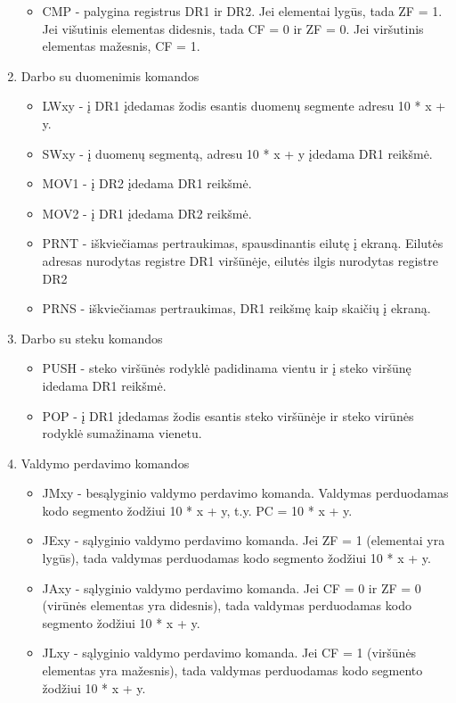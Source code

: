 \begin{enumerate}
		\begin{itemize}
		\item CMP - palygina registrus DR1 ir DR2. Jei elementai lygūs, tada ZF = 1. Jei višutinis elementas didesnis, tada CF = 0 ir  ZF = 0. Jei viršutinis elementas mažesnis, CF = 1.
		\end{itemize}
	\item Darbo su duomenimis komandos
		\begin{itemize}
		\item LWxy - į DR1 įdedamas žodis esantis duomenų segmente adresu 10 * x + y.
		\item SWxy - į duomenų segmentą, adresu 10 * x + y įdedama DR1 reikšmė.
		\item MOV1 - į DR2 įdedama DR1 reikšmė.
		\item MOV2 - į DR1 įdedama DR2 reikšmė.
		\item PRNT - iškviečiamas pertraukimas, spausdinantis eilutę į ekraną. Eilutės adresas nurodytas registre DR1 viršūnėje, eilutės ilgis nurodytas registre DR2
		\item PRNS - iškviečiamas pertraukimas, DR1 reikšmę kaip skaičių į ekraną.
		\end{itemize}
	\item Darbo su steku komandos
		\begin{itemize}
		\item PUSH - steko viršūnės rodyklė padidinama vientu ir į steko viršūnę idedama DR1 reikšmė.
		\item POP - į DR1 įdedamas žodis esantis steko viršūnėje ir steko virūnės rodyklė sumažinama vienetu.
		\end{itemize}
	\item Valdymo perdavimo komandos
		\begin{itemize}
		\item JMxy - besąlyginio valdymo perdavimo komanda. Valdymas perduodamas kodo segmento žodžiui 10 * x + y, t.y. PC = 10 * x + y.
		\item JExy - sąlyginio valdymo perdavimo komanda. Jei ZF = 1 (elementai yra lygūs), tada valdymas perduodamas kodo segmento žodžiui 10 * x + y.
		\item JAxy - sąlyginio valdymo perdavimo komanda. Jei CF = 0 ir ZF = 0 (virūnės elementas yra didesnis), tada valdymas perduodamas kodo segmento žodžiui 10 * x + y.
		\item JLxy  - sąlyginio valdymo perdavimo komanda. Jei CF = 1 (viršūnės elementas yra mažesnis), tada valdymas perduodamas kodo segmento žodžiui 10 * x + y.
		\end{itemize}

\end{enumerate}
